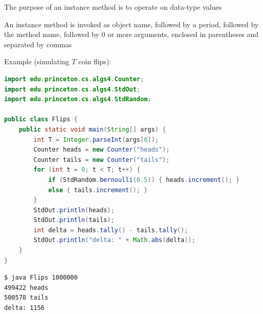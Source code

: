 \documentclass[8pt,a4paper,compress]{beamer}
\begin{document}
\begin{frame}[fragile]
The purpose of an instance method is to operate on data-type values

\bigskip

An instance method is invoked as object name, followed by a period, followed by the method name, followed by 0 or more arguments, enclosed in parentheses and separated by commas

\bigskip

Example (simulating $T$ coin flips):

\begin{lstlisting}[language=Java]
import edu.princeton.cs.algs4.Counter;
import edu.princeton.cs.algs4.StdOut;
import edu.princeton.cs.algs4.StdRandom;

public class Flips {
    public static void main(String[] args) {
        int T = Integer.parseInt(args[0]);
        Counter heads = new Counter("heads");
        Counter tails = new Counter("tails");
        for (int t = 0; t < T; t++) {
            if (StdRandom.bernoulli(0.5)) { heads.increment(); }
            else { tails.increment(); }
        }
        StdOut.println(heads);
        StdOut.println(tails);
        int delta = heads.tally() - tails.tally();
        StdOut.println("delta: " + Math.abs(delta));
    }
}
\end{lstlisting}

\begin{lstlisting}[language={}]
$ java Flips 1000000
499422 heads
500578 tails
delta: 1156
\end{lstlisting}
\end{frame}
\end{document}
